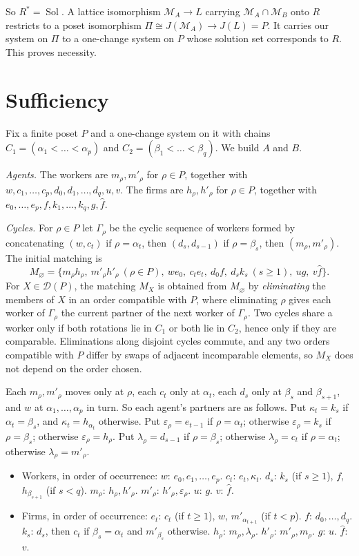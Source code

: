 \documentclass[11pt]{amsart}
\theoremstyle{definition}
\theoremstyle{remark}
\newcommand{\D}{\mathcal D}
\newcommand{\Sol}{\operatorname{Sol}}
\begin{document}
So $R^*=\Sol$. A lattice isomorphism $\mathcal M_A\to L$ carrying $\mathcal M_A\cap\mathcal M_B$ onto $R$ restricts to a poset isomorphism $\Pi\cong J(\mathcal M_A)\to J(L)=P$. It carries our system on $\Pi$ to a one-change system on $P$ whose solution set corresponds to $R$. This proves necessity.

\section{Sufficiency}

Fix a finite poset $P$ and a one-change system on it with chains $C_1=(\alpha_1<\dots<\alpha_p)$ and $C_2=(\beta_1<\dots<\beta_q)$. We build $A$ and $B$.

\emph{Agents.} The workers are $m_\rho,m'_\rho$ for $\rho\in P$, together with $w,c_1,\dots,c_p,d_0,d_1,\dots,d_q,u,v$. The firms are $h_\rho,h'_\rho$ for $\rho\in P$, together with $e_0,\dots,e_p,f,k_1,\dots,k_q,g,\hat f$.

\emph{Cycles.} For $\rho\in P$ let $\Gamma_\rho$ be the cyclic sequence of workers formed by concatenating $(w,c_t)$ if $\rho=\alpha_t$, then $(d_s,d_{s-1})$ if $\rho=\beta_s$, then $(m_\rho,m'_\rho)$. The initial matching is
\[
M_\varnothing=\{m_\rho h_\rho,\ m'_\rho h'_\rho\ (\rho\in P),\ we_0,\ c_te_t,\ d_0f,\ d_sk_s\ (s\ge1),\ ug,\ v\hat f\}.
\]
For $X\in\D(P)$, the matching $M_X$ is obtained from $M_\varnothing$ by \emph{eliminating} the members of $X$ in an order compatible with $P$, where eliminating $\rho$ gives each worker of $\Gamma_\rho$ the current partner of the next worker of $\Gamma_\rho$. Two cycles share a worker only if both rotations lie in $C_1$ or both lie in $C_2$, hence only if they are comparable. Eliminations along disjoint cycles commute, and any two orders compatible with $P$ differ by swaps of adjacent incomparable elements, so $M_X$ does not depend on the order chosen.

Each $m_\rho,m'_\rho$ moves only at $\rho$, each $c_t$ only at $\alpha_t$, each $d_s$ only at $\beta_s$ and $\beta_{s+1}$, and $w$ at $\alpha_1,\dots,\alpha_p$ in turn. So each agent's partners are as follows. Put $\kappa_t=k_s$ if $\alpha_t=\beta_s$, and $\kappa_t=h_{\alpha_t}$ otherwise. Put $\varepsilon_\rho=e_{t-1}$ if $\rho=\alpha_t$; otherwise $\varepsilon_\rho=k_s$ if $\rho=\beta_s$; otherwise $\varepsilon_\rho=h_\rho$. Put $\lambda_\rho=d_{s-1}$ if $\rho=\beta_s$; otherwise $\lambda_\rho=c_t$ if $\rho=\alpha_t$; otherwise $\lambda_\rho=m'_\rho$.
\begin{itemize}
\item Workers, in order of occurrence: $w$: $e_0,e_1,\dots,e_p$. $c_t$: $e_t,\kappa_t$. $d_s$: $k_s$ (if $s\ge1$), $f$, $h_{\beta_{s+1}}$ (if $s<q$). $m_\rho$: $h_\rho,h'_\rho$. $m'_\rho$: $h'_\rho,\varepsilon_\rho$. $u$: $g$. $v$: $\hat f$.
\item Firms, in order of occurrence: $e_t$: $c_t$ (if $t\ge1$), $w$, $m'_{\alpha_{t+1}}$ (if $t<p$). $f$: $d_0,\dots,d_q$. $k_s$: $d_s$, then $c_t$ if $\beta_s=\alpha_t$ and $m'_{\beta_s}$ otherwise. $h_\rho$: $m_\rho,\lambda_\rho$. $h'_\rho$: $m'_\rho,m_\rho$. $g$: $u$. $\hat f$: $v$.
\end{itemize}
\end{document}
